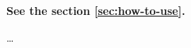 \chapter{}
\label{sec:Introduction}

\textbf{See the section \ref{sec:how-to-use}.}

\dots
\Blindtext
